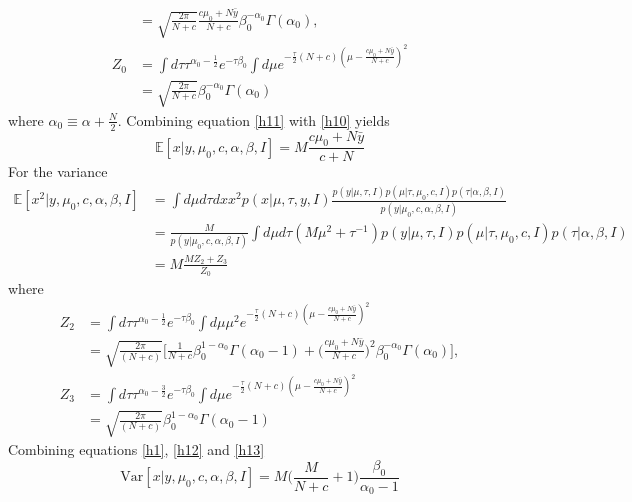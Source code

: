 \begin{example}
\begin{equation}
\begin{split}
			&=\sqrt{\frac{2\pi}{N+c}}\frac{c\mu_0+N\bar{y}}{N+c}\beta_0^{-\alpha_0}\Gamma(\alpha_0), \\ 
			Z_0 &= \int d\tau \tau^{\alpha_0-\frac{1}{2}}e^{-\tau\beta_0} \int d\mu e^{-\frac{\tau}{2}(N+c)(\mu-\frac{c\mu_0+N\bar{y}}{N+c})^2}\\
			&=\sqrt{\frac{2\pi}{N+c}}\beta_0^{-\alpha_0}\Gamma(\alpha_0)
		\end{split}
		\label{h10}
	\end{equation} 
	where $\alpha_0\equiv \alpha+\frac{N}{2}$. Combining equation \eqref{h11} with \eqref{h10} yields
	\begin{equation}
		\mathbb{E}[x|y,\mu_0,c,\alpha,\beta,I]= M\frac{c\mu_0+N\bar{y}}{c+N}
	\end{equation}
	For the variance
	\begin{equation}
		\begin{split}
			\mathbb{E}[x^2|y,\mu_0,c,\alpha,\beta,I] &= \int d\mu d\tau dx x^2p(x|\mu,\tau,y,I)\frac{p(y|\mu,\tau,I)p(\mu|\tau,\mu_0,c,I)p(\tau|\alpha,\beta,I)}{p(y|\mu_0,c,\alpha,\beta,I)}\\
			&=\frac{M}{p(y|\mu_0,c,\alpha,\beta,I)}\int d\mu d\tau (M\mu^2+\tau^{-1}) p(y|\mu,\tau,I)p(\mu|\tau,\mu_0,c,I)p(\tau|\alpha,\beta,I)\\
			&=M\frac{MZ_2+Z_3}{Z_0}
		\end{split}
		\label{h12}
	\end{equation}
	where
	\begin{equation}
		\begin{split}
			Z_2 &= \int d\tau \tau^{\alpha_0-\frac{1}{2}}e^{-\tau\beta_0} \int d\mu \mu^2 e^{-\frac{\tau}{2}(N+c)(\mu-\frac{c\mu_0+N\bar{y}}{N+c})^2}\\
			& = \sqrt{\frac{2\pi}{(N+c)}}\bigg[\frac{1}{N+c}\beta_0^{1-\alpha_0}\Gamma(\alpha_0-1)+\bigg(\frac{c\mu_0+N\bar{y}}{N+c}\bigg)^2\beta_0^{-\alpha_0}\Gamma(\alpha_0) \bigg],\\
			Z_3 &= \int d\tau \tau^{\alpha_0-\frac{3}{2}}e^{-\tau\beta_0} \int d\mu  e^{-\frac{\tau}{2}(N+c)(\mu-\frac{c\mu_0+N\bar{y}}{N+c})^2}\\
			&=\sqrt{\frac{2\pi}{(N+c)}}\beta_0^{1-\alpha_0}\Gamma(\alpha_0-1)
		\end{split}
		\label{h13}
	\end{equation}
	Combining equations \eqref{h1}, \eqref{h12} and \eqref{h13}
	\begin{equation}
		\text{Var}[x|y,\mu_0,c,\alpha,\beta,I]=M\bigg(\frac{M}{N+c}+1\bigg)\frac{\beta_0}{\alpha_0-1}
	\end{equation}

\end{example}

